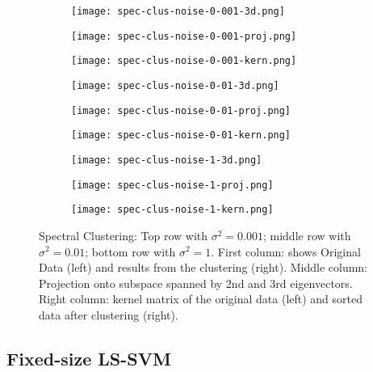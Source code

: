 \documentclass[paper=a4, fontsize=11pt]{scrartcl} %
\numberwithin{equation}{section} %
\begin{document}
\begin{figure}[ht]
\centering
	\begin{subfigure}[b]{0.3\textwidth}
		\centering
		\texttt{[image: spec-clus-noise-0-001-3d.png]}
	\end{subfigure}%
	\begin{subfigure}[b]{0.3\textwidth}
		\centering
		\texttt{[image: spec-clus-noise-0-001-proj.png]}
	\end{subfigure}%
	\begin{subfigure}[b]{0.3\textwidth}
		\centering
		\texttt{[image: spec-clus-noise-0-001-kern.png]}
	\end{subfigure}
	\begin{subfigure}[b]{0.3\textwidth}
		\centering
		\texttt{[image: spec-clus-noise-0-01-3d.png]}
	\end{subfigure}%
	\begin{subfigure}[b]{0.3\textwidth}
		\centering
		\texttt{[image: spec-clus-noise-0-01-proj.png]}
	\end{subfigure}%
	\begin{subfigure}[b]{0.3\textwidth}
		\centering
		\texttt{[image: spec-clus-noise-0-01-kern.png]}
	\end{subfigure}
		\begin{subfigure}[b]{0.3\textwidth}
		\centering
		\texttt{[image: spec-clus-noise-1-3d.png]}
	\end{subfigure}%
	\begin{subfigure}[b]{0.3\textwidth}
		\centering
		\texttt{[image: spec-clus-noise-1-proj.png]}
	\end{subfigure}%
	\begin{subfigure}[b]{0.3\textwidth}
		\centering
		\texttt{[image: spec-clus-noise-1-kern.png]}
	\end{subfigure}
\caption{Spectral Clustering: Top row with $\sigma^2 = 0.001$; middle row with $\sigma^2 = 0.01$; bottom row with $\sigma^2 = 1$. First column: shows Original Data (left) and results from the clustering (right). Middle column: Projection onto subspace spanned by 2nd and 3rd eigenvectors. Right column: kernel matrix of the original data (left) and sorted data after clustering (right).} 
\label{spec-clust}
\end{figure}

\subsection{Fixed-size LS-SVM}
\end{document}
